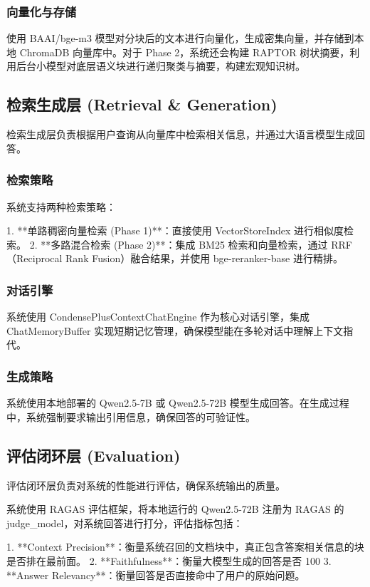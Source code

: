 \subsubsection{向量化与存储}
使用 BAAI/bge-m3 模型对分块后的文本进行向量化，生成密集向量，并存储到本地 ChromaDB 向量库中。对于 Phase 2，系统还会构建 RAPTOR 树状摘要，利用后台小模型对底层语义块进行递归聚类与摘要，构建宏观知识树。

\subsection{检索生成层 (Retrieval \& Generation)}

检索生成层负责根据用户查询从向量库中检索相关信息，并通过大语言模型生成回答。

\subsubsection{检索策略}
系统支持两种检索策略：

1. **单路稠密向量检索 (Phase 1)**：直接使用 VectorStoreIndex 进行相似度检索。
2. **多路混合检索 (Phase 2)**：集成 BM25 检索和向量检索，通过 RRF（Reciprocal Rank Fusion）融合结果，并使用 bge-reranker-base 进行精排。

\subsubsection{对话引擎}
系统使用 CondensePlusContextChatEngine 作为核心对话引擎，集成 ChatMemoryBuffer 实现短期记忆管理，确保模型能在多轮对话中理解上下文指代。

\subsubsection{生成策略}
系统使用本地部署的 Qwen2.5-7B 或 Qwen2.5-72B 模型生成回答。在生成过程中，系统强制要求输出引用信息，确保回答的可验证性。

\subsection{评估闭环层 (Evaluation)}

评估闭环层负责对系统的性能进行评估，确保系统输出的质量。

系统使用 RAGAS 评估框架，将本地运行的 Qwen2.5-72B 注册为 RAGAS 的 judge_model，对系统回答进行打分，评估指标包括：

1. **Context Precision**：衡量系统召回的文档块中，真正包含答案相关信息的块是否排在最前面。
2. **Faithfulness**：衡量大模型生成的回答是否 100%
3. **Answer Relevancy**：衡量回答是否直接命中了用户的原始问题。

